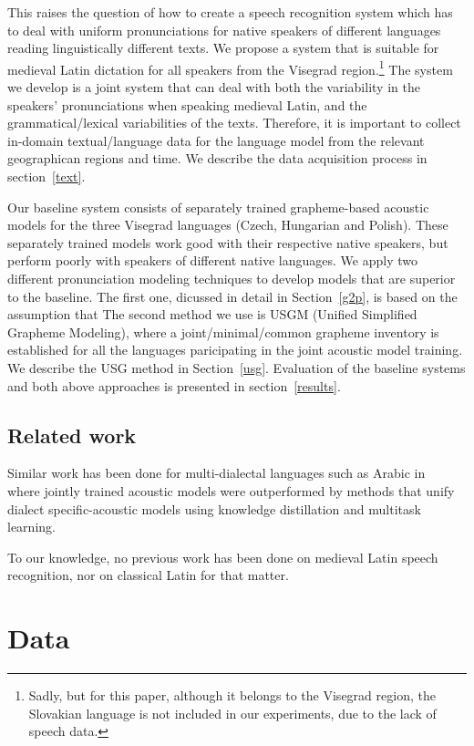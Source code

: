 \documentclass[runningheads,a4paper]{llncs}
\begin{document}
This raises the question of how to create a speech recognition system which has to deal with uniform pronunciations for native speakers of different languages reading linguistically different texts.
We propose a system that is suitable for medieval Latin dictation for all speakers from the Visegrad region.\footnote{Sadly, but for this paper, although it belongs to the Visegrad region, the Slovakian language is not included in our experiments, due to the lack of speech data.}
The system we develop is a joint system that can deal with both the variability in the speakers' pronunciations when speaking medieval Latin, and the grammatical/lexical variabilities of the texts.
Therefore, it is important to collect in-domain textual/language data for the language model from the relevant geographican regions and time.
We describe the data acquisition process in section~\ref{text}.

Our baseline system consists of separately trained grapheme-based acoustic models for the three Visegrad languages (Czech, Hungarian and Polish). 
These separately trained models work good with their respective native speakers, but perform poorly with speakers of different native languages.
We apply two different pronunciation modeling techniques to develop models that are superior to the baseline.
The first one, dicussed in detail in Section~\ref{g2p}, is based on the assumption that 
The second method we use is USGM (Unified Simplified Grapheme Modeling), where a joint/minimal/common grapheme inventory is established for all the languages paricipating in the joint acoustic model training.
We describe the USG method in Section~\ref{usg}.
Evaluation of the baseline systems and both above approaches is presented in section~\ref{results}.

\subsection{Related work}
Similar work has been done for multi-dialectal languages such as Arabic in~\cite{elfeky16} where jointly trained acoustic models were outperformed by methods that unify dialect specific-acoustic models using knowledge distillation and multitask learning.

To our knowledge, no previous work has been done on medieval Latin speech recognition, nor on classical Latin for that matter.

\section{Data}
\end{document}
